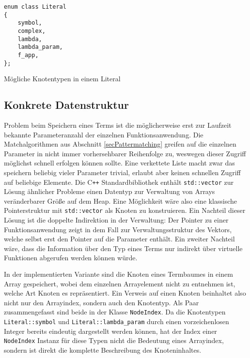\documentclass{scrartcl}
\numberwithin{figure}{section} %
\theoremstyle{definition} %
\begin{document}
\begin{listing}
\small
\begin{verbatim}
enum class Literal
{
    symbol,
    complex,
    lambda,
    lambda_param,
    f_app,
};
\end{verbatim}
\label{abbLiteralEnum}
\caption{Mögliche Knotentypen in einem Literal}
\end{listing}

\subsection{Konkrete Datenstruktur} \label{subsecKonkreteDatenstruktur}

Problem beim Speichern eines Terms ist die möglicherweise erst zur Laufzeit bekannte Parameteranzahl der einzelnen Funktionsanwendung. Die Matchalgorithmen aus Abschnitt \ref{secPattermatching} greifen auf die einzelnen Parameter in nicht immer vorhersehbarer Reihenfolge zu, weswegen dieser Zugriff möglichst schnell erfolgen können sollte. Eine verkettete Liste macht zwar das speichern beliebig vieler Parameter trivial, erlaubt aber keinen schnellen Zugriff auf beliebige Elemente. Die C\texttt{++} Standardbibliothek enthält \texttt{std::vector} zur Lösung ähnlicher Probleme einen Datentyp zur Verwaltung von Arrays veränderbarer Größe auf dem Heap. Eine Möglichkeit wäre also eine klassische Pointerstruktur mit \texttt{std::vector} als Knoten zu konstruieren. Ein Nachteil dieser Lösung ist die doppelte Indirektion in der Verwaltung: Der Pointer zu einer Funktionsanwendung zeigt in dem Fall zur Verwaltungsstruktur des Vektors, welche selbst erst den Pointer auf die Parameter enthält. Ein zweiter Nachteil wäre, dass die Information über den Typ eines Terms nur indirekt über virtuelle Funktionen abgerufen werden können würde. 


In der implementierten Variante sind die Knoten eines Termbaumes in einem Array gespeichert, wobei dem einzelnen Arrayelement nicht zu entnehmen ist, welche Art Knoten es repräsentiert. Ein Verweis auf einen Knoten beinhaltet also nicht nur den Arrayindex, sondern auch den Knotentyp. Als Paar zusammengefasst sind beide in der Klasse \texttt{NodeIndex}. 
Da die Knotentypen \texttt{Literal::symbol} und \texttt{Literal::lambda_param} durch einen vorzeichenlosen Integer bereits eindeutig dargestellt werden können, hat der Index einer \texttt{NodeIndex} Instanz für diese Typen nicht die Bedeutung eines Arrayindex, sondern ist direkt die komplette Beschreibung des Knoteninhaltes.
\end{document}
